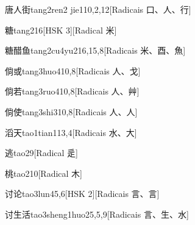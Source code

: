 \begin{entry}{唐人街}{tang2ren2 jie1}{10,2,12}[Radicais ⼝、⼈、⾏]
\end{entry}

\begin{entry}{糖}{tang2}{16}[HSK 3][Radical ⽶]
\end{entry}

\begin{entry}{糖醋鱼}{tang2cu4yu2}{16,15,8}[Radicais ⽶、⾣、⿂]
\end{entry}

\begin{entry}{倘或}{tang3huo4}{10,8}[Radicais ⼈、⼽]
\end{entry}

\begin{entry}{倘若}{tang3ruo4}{10,8}[Radicais ⼈、⾋]
\end{entry}

\begin{entry}{倘使}{tang3shi3}{10,8}[Radicais ⼈、⼈]
\end{entry}

\begin{entry}{滔天}{tao1tian1}{13,4}[Radicais ⽔、⼤]
\end{entry}

\begin{entry}{逃}{tao2}{9}[Radical ⾡]
\end{entry}

\begin{entry}{桃}{tao2}{10}[Radical ⽊]
\end{entry}

\begin{entry}{讨论}{tao3lun4}{5,6}[HSK 2][Radicais ⾔、⾔]
\end{entry}

\begin{entry}{讨生活}{tao3sheng1huo2}{5,5,9}[Radicais ⾔、⽣、⽔]
\end{entry}

